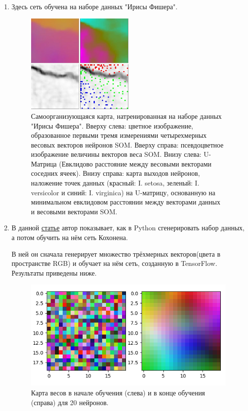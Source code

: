 \documentclass[a4paper,12pt]{article}
\begin{document}
\begin{enumerate}
  \item Здесь сеть обучена на наборе данных "Ирисы Фишера"\cite{fishers_irises}.
  \begin{figure}[H]
    \centering
    \includegraphics[width=0.5\textwidth]{som_fisher.jpeg}
    \caption{
      Самоорганизующаяся карта, натренированная на наборе данных "Ирисы Фишера"\cite{fishers_irises}. Вверху слева: цветное изображение, образованное первыми тремя измерениями четырехмерных весовых векторов нейронов SOM. Вверху справа: псевдоцветное изображение величины векторов веса SOM. Внизу слева: U-Матрица (Евклидово расстояние между весовыми векторами соседних ячеек). Внизу справа: карта выходов нейронов, наложение точек данных (красный: I. setosa, зеленый: I. versicolor и синий: I. virginica) на U-матрицу, основанную на минимальном евклидовом расстоянии между векторами данных и весовыми векторами SOM.
    }
    \label{img:fisher}
  \end{figure}

  \item В данной \href{https://habr.com/ru/post/334810/}{статье} автор показывает, как в Python сгенерировать набор данных, а потом обучить на нём сеть Кохонена.

  В ней он сначала генерирует множество трёхмерных векторов(цвета в пространстве RGB) и обучает на нём сеть, созданную в TensorFlow. Результаты приведены ниже.\cite{habr}

  \begin{figure}[H]
    \centering
    \includegraphics[width=\textwidth]{habr-20.png}
    \caption{Карта весов в начале обучения (слева) и в конце обучения (справа) для 20 нейронов.}
  \end{figure}


\end{enumerate}
\end{document}
